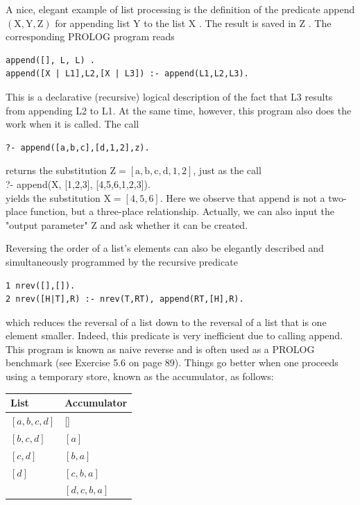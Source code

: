 \documentclass[10pt]{article}
\begin{document}
A nice, elegant example of list processing is the definition of the predicate append $(\mathrm{X}, \mathrm{Y}, \mathrm{Z})$ for appending list Y to the list X . The result is saved in Z . The corresponding PROLOG program reads

\begin{verbatim}
append([], L, L) .
append([X | L1],L2,[X | L3]) :- append(L1,L2,L3).
\end{verbatim}

This is a declarative (recursive) logical description of the fact that L3 results from appending L2 to L1. At the same time, however, this program also does the work when it is called. The call

\begin{verbatim}
?- append([a,b,c],[d,1,2],z).
\end{verbatim}

returns the substitution $\mathrm{Z}=[\mathrm{a}, \mathrm{b}, \mathrm{c}, \mathrm{d}, 1,2]$, just as the call\\[0pt]
?- append(X, [1,2,3], [4,5,6,1,2,3]).\\
yields the substitution $\mathrm{X}=[4,5,6]$. Here we observe that append is not a two-place function, but a three-place relationship. Actually, we can also input the "output parameter" Z and ask whether it can be created.

Reversing the order of a list's elements can also be elegantly described and simultaneously programmed by the recursive predicate

\begin{verbatim}
1 nrev([],[]).
2 nrev([H|T],R) :- nrev(T,RT), append(RT,[H],R).
\end{verbatim}

which reduces the reversal of a list down to the reversal of a list that is one element smaller. Indeed, this predicate is very inefficient due to calling append. This program is known as naive reverse and is often used as a PROLOG benchmark (see Exercise 5.6 on page 89). Things go better when one proceeds using a temporary store, known as the accumulator, as follows:

\begin{center}
\begin{tabular}{ll}
\hline
List & Accumulator \\
\hline
$[a, b, c, d]$ & [] \\
\hline
$[b, c, d]$ & $[a]$ \\
\hline
$[c, d]$ & $[b, a]$ \\
\hline
$[d]$ & $[c, b, a]$ \\
\hline
[] & $[d, c, b, a]$ \\
\hline
\end{tabular}
\end{center}
\end{document}

